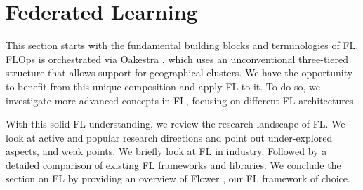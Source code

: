 \section{Federated Learning}\label{section:federated_learning}

This section starts with the fundamental building blocks and terminologies of FL.
FLOps is orchestrated via Oakestra \cite{paper:oakestra_usenix}, which uses an unconventional
three-tiered structure that allows support for geographical clusters.
We have the opportunity to benefit from this unique composition and apply FL to it.
To do so, we investigate more advanced concepts in FL, focusing on different FL architectures.

With this solid FL understanding, we review the research landscape of FL.
We look at active and popular research directions and point out under-explored aspects,
and weak points.
We briefly look at FL in industry.
Followed by a detailed comparison of existing FL frameworks and libraries.
We conclude the section on FL by providing an overview of Flower \cite{flower_docs}, our FL framework of choice.







